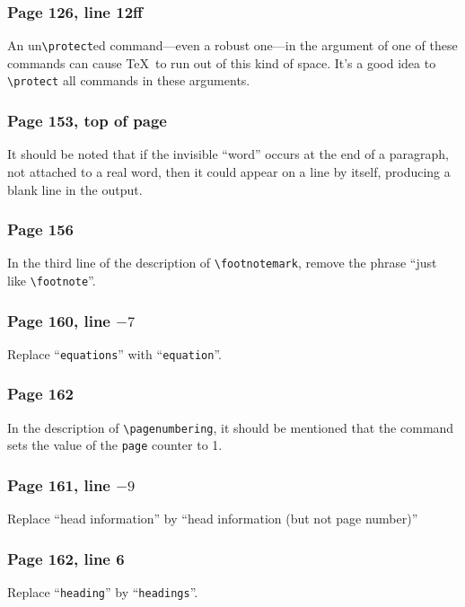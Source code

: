\subsubsection*{Page 126, line 12ff}
An un\verb|\protect|ed command---even a robust one---in the argument
of one of these commands can cause \TeX\ to run out of this kind of
space.  It's a good idea to \verb|\protect| all commands in
these arguments.


\subsubsection*{Page 153, top of page}
It should be noted that if the invisible ``word'' occurs at the end
of a paragraph, not attached to a real word, then it could appear
on a line by itself, producing a blank line in the output.

\subsubsection*{Page 156}
In the third line of the description of \verb|\footnotemark|, 
remove the phrase ``just like \verb|\footnote|''.

\subsubsection*{Page 160, line $-7$}
Replace ``{\tt equations}'' with ``{\tt equation}''.

\subsubsection*{Page 162}

In the description of \verb|\pagenumbering|, it should be mentioned
that the command sets the value of the {\tt page} counter to 1.

\subsubsection*{Page 161, line $-9$}
Replace ``head information'' by ``head information (but not
page number)''

\subsubsection*{Page 162, line 6}
Replace ``{\tt heading}'' by ``{\tt headings}''.

